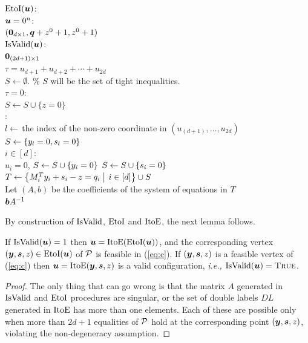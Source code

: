 \begin{algo}
  \underline{$\mbox{EtoI}(\mbox{\boldmath $u$})$}:\+
  \\\IfB $\mbox{\boldmath $u$}=0^n$:\+
  \\  \ReturnB $(\mbox{\boldmath $0$}_{d \times 1}, \mbox{\boldmath $q$}+z^0+1, z^0+1)$\quad{}\-
  \\\IfB \NotB $\mbox{IsValid}(\mbox{\boldmath $u$})$:\+
  \\  \ReturnB $\mbox{\boldmath $0$}_{(2d+1) \times 1}$\-
  \\$\tau = u_{d+1}+u_{d+2}+\dotsb+u_{2d} $
  \\$S\gets \emptyset$. \% $S$ will be the set of tight inequalities. 
  \\\IfB $\tau = 0$:\+
  \\  $S\gets S\cup \{ z=0\}$\-
  \\\ElseB:\quad{}\+
  \\  $l\gets$\,the index of the non-zero coordinate in $(u_{(d+1)},\dots,u_{2d})$
  \\  $S\gets \left\{ y_l = 0, s_l = 0 \right\}$\-
  \\\ForB $i \in [d]$:\+
  \\  \IfB $u_i = 0$, \ThenB $S\gets S\cup \left\{ y_i = 0 \right\}$ \ElseB $S\gets S\cup \left\{ s_i = 0 \right\}$\-
  \\$T \gets \Setbar{M^T_i y_i + s_i - z = q_i}{i\in [d]} \cup S$
  \\Let $(A,b)$ be the coefficients of the system of equations in $T$
  \\\ReturnB $\mbox{\boldmath $b$} A^{-1}$
\end{algo}

By construction of $\mbox{IsValid}$, $\mbox{EtoI}$ and $\mbox{ItoE}$, the next lemma follows.

\begin{lemma}\label{lem:vert}
If $\mbox{IsValid}(\mbox{\boldmath $u$})=1$ then $\mbox{\boldmath $u$}=\mbox{ItoE}(\mbox{EtoI}(\mbox{\boldmath $u$}))$, and the corresponding vertex $(\mbox{\boldmath $y$},\mbox{\boldmath $s$},z)\in \mbox{EtoI}(\mbox{\boldmath $u$})$ of $\mbox{${\mathcal P}$}$ is feasible in (\ref{eq:c}). If $(\mbox{\boldmath $y$},\mbox{\boldmath $s$},z)$ is a feasible vertex of (\ref{eq:c}) then $\mbox{\boldmath $u$}=\mbox{ItoE}(\mbox{\boldmath $y$},\mbox{\boldmath $s$},z)$ is a valid configuration, {\em i.e.,} $\mbox{IsValid}(\mbox{\boldmath $u$})=\textsc{True}$.
\end{lemma}
\begin{proof}
The only thing that can go wrong is that the matrix $A$ generated in $\mbox{IsValid}$ and $\mbox{EtoI}$ procedures are singular, or the set of double labels $DL$ generated in $\mbox{ItoE}$ has more than one elements. 
Each of these are possible only when more than $2d+1$ equalities of $\mbox{${\mathcal P}$}$ hold at the corresponding point $(\mbox{\boldmath $y$},\mbox{\boldmath $s$},z)$, violating the non-degeneracy assumption. 
\end{proof}

